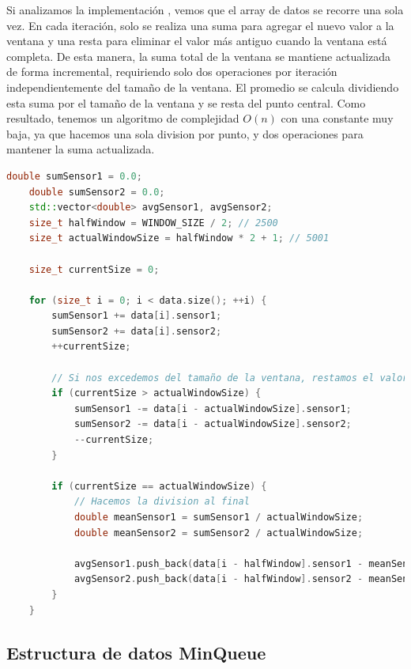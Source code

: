 \documentclass[12pt,a4paper]{article}
\begin{document}
Si analizamos la implementación , vemos que el array de datos se recorre una sola vez. En cada iteración, solo se realiza una suma para agregar el nuevo valor a la ventana y una resta para eliminar el valor más antiguo cuando la ventana está completa. De esta manera, la suma total de la ventana se mantiene actualizada de forma incremental, requiriendo solo dos operaciones por iteración independientemente del tamaño de la ventana. El promedio se calcula dividiendo esta suma por el tamaño de la ventana y se resta del punto central. Como resultado, tenemos un algoritmo de complejidad $O(n)$ con una constante muy baja, ya que hacemos una sola division por punto, y dos operaciones para mantener la suma actualizada.

\begin{lstlisting}[language=C++, label=lst:codigo_promedio_movil, caption={normalizer.cpp - Algoritmo optimizado de ventana deslizante con complejidad O(n)}]
    double sumSensor1 = 0.0;
    double sumSensor2 = 0.0;
    std::vector<double> avgSensor1, avgSensor2;
    size_t halfWindow = WINDOW_SIZE / 2; // 2500
    size_t actualWindowSize = halfWindow * 2 + 1; // 5001

    size_t currentSize = 0;

    for (size_t i = 0; i < data.size(); ++i) {
        sumSensor1 += data[i].sensor1;
        sumSensor2 += data[i].sensor2;
        ++currentSize;

        // Si nos excedemos del tamaño de la ventana, restamos el valor mas viejo
        if (currentSize > actualWindowSize) {
            sumSensor1 -= data[i - actualWindowSize].sensor1;
            sumSensor2 -= data[i - actualWindowSize].sensor2;
            --currentSize;
        }

        if (currentSize == actualWindowSize) {
            // Hacemos la division al final
            double meanSensor1 = sumSensor1 / actualWindowSize;
            double meanSensor2 = sumSensor2 / actualWindowSize;

            avgSensor1.push_back(data[i - halfWindow].sensor1 - meanSensor1);
            avgSensor2.push_back(data[i - halfWindow].sensor2 - meanSensor2);
        }
    }
\end{lstlisting}

\subsection{Estructura de datos MinQueue}
\end{document}
